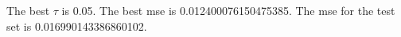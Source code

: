 \begin{answer}
The best $\tau$ is 0.05. The best mse is 0.012400076150475385. The mse for the test set is 0.016990143386860102.
\end{answer}

